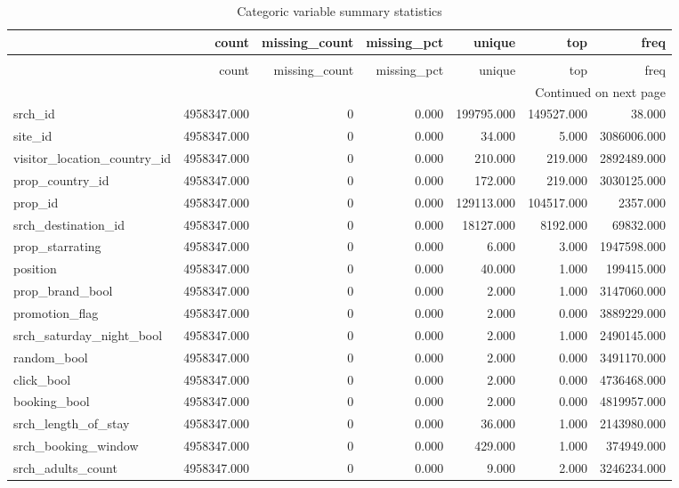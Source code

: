 \begin{longtable}{lrrrrrr}
\caption{Categoric variable summary statistics} \label{tab:categoric_summary_stats} \\
\toprule
 & count & missing\_count & missing\_pct & unique & top & freq \\
\midrule
\endfirsthead
\caption[]{Categoric variable summary statistics} \\
\toprule
 & count & missing\_count & missing\_pct & unique & top & freq \\
\midrule
\endhead
\midrule
\multicolumn{7}{r}{Continued on next page} \\
\midrule
\endfoot
\bottomrule
\endlastfoot
srch\_id & 4958347.000 & 0 & 0.000 & 199795.000 & 149527.000 & 38.000 \\
site\_id & 4958347.000 & 0 & 0.000 & 34.000 & 5.000 & 3086006.000 \\
visitor\_location\_country\_id & 4958347.000 & 0 & 0.000 & 210.000 & 219.000 & 2892489.000 \\
prop\_country\_id & 4958347.000 & 0 & 0.000 & 172.000 & 219.000 & 3030125.000 \\
prop\_id & 4958347.000 & 0 & 0.000 & 129113.000 & 104517.000 & 2357.000 \\
srch\_destination\_id & 4958347.000 & 0 & 0.000 & 18127.000 & 8192.000 & 69832.000 \\
prop\_starrating & 4958347.000 & 0 & 0.000 & 6.000 & 3.000 & 1947598.000 \\
position & 4958347.000 & 0 & 0.000 & 40.000 & 1.000 & 199415.000 \\
prop\_brand\_bool & 4958347.000 & 0 & 0.000 & 2.000 & 1.000 & 3147060.000 \\
promotion\_flag & 4958347.000 & 0 & 0.000 & 2.000 & 0.000 & 3889229.000 \\
srch\_saturday\_night\_bool & 4958347.000 & 0 & 0.000 & 2.000 & 1.000 & 2490145.000 \\
random\_bool & 4958347.000 & 0 & 0.000 & 2.000 & 0.000 & 3491170.000 \\
click\_bool & 4958347.000 & 0 & 0.000 & 2.000 & 0.000 & 4736468.000 \\
booking\_bool & 4958347.000 & 0 & 0.000 & 2.000 & 0.000 & 4819957.000 \\
srch\_length\_of\_stay & 4958347.000 & 0 & 0.000 & 36.000 & 1.000 & 2143980.000 \\
srch\_booking\_window & 4958347.000 & 0 & 0.000 & 429.000 & 1.000 & 374949.000 \\
srch\_adults\_count & 4958347.000 & 0 & 0.000 & 9.000 & 2.000 & 3246234.000 \\

\end{longtable}
